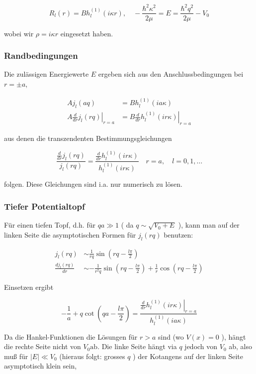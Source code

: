 \documentclass[10pt, letterpaper]{article}
\begin{document}
$$
R_{l}(r)=B h_{l}^{(1)}(i \kappa r), \quad-\frac{\hbar^{2} \kappa^{2}}{2 \mu}=E=\frac{\hbar^{2} q^{2}}{2 \mu}-V_{0}
$$

wobei wir $\rho=i \kappa r$ eingesetzt haben.

\subsubsection*{Randbedingungen}
Die zulässigen Energiewerte $E$ ergeben sich aus den Anschlussbedingungen bei $r= \pm a$,

$$
\begin{aligned}
A j_{l}(a q) & =B h_{l}^{(1)}(i a \kappa) \\
\left.A \frac{d}{d r} j_{l}(r q)\right|_{r=a} & =\left.B \frac{d}{d r} h_{l}^{(1)}(i r \kappa)\right|_{r=a}
\end{aligned}
$$

aus denen die transzendenten Bestimmungsgleichungen

$$
\frac{\frac{d}{d r} j_{l}(r q)}{j_{l}(r q)}=\frac{\frac{d}{d r} h_{l}^{(1)}(i r \kappa)}{h_{l}^{(1)}(i r \kappa)} \quad r=a, \quad l=0,1, \ldots
$$

folgen. Diese Gleichungen sind i.a. nur numerisch zu lösen.

\subsubsection*{Tiefer Potentialtopf}
Für einen tiefen Topf, d.h. für $q a \gg 1$ ( da $q \sim \sqrt{V_{0}+E}$ ), kann man auf der linken Seite die asymptotischen Formen für $j_{l}(r q)$ benutzen:

$$
\begin{aligned}
j_{l}(r q) & \sim \frac{1}{r q} \sin \left(r q-\frac{l \pi}{2}\right) \\
\frac{d j_{l}(r q)}{d r} & \sim-\frac{1}{r^{2} q} \sin \left(r q-\frac{l \pi}{2}\right)+\frac{1}{r} \cos \left(r q-\frac{l \pi}{2}\right)
\end{aligned}
$$

Einsetzen ergibt

$$
-\frac{1}{a}+q \cot \left(q a-\frac{l \pi}{2}\right)=\frac{\left.\frac{d}{d r} h_{l}^{(1)}(i r \kappa)\right|_{r=a}}{h_{l}^{(1)}(i a \kappa)}
$$

Da die Hankel-Funktionen die Lösungen für $r>a$ sind (wo $V(x)=0$ ), hängt die rechte Seite nicht von $V_{0} \mathrm{ab}$. Die linke Seite hängt via $q$ jedoch von $V_{0}$ ab, also muß für $|E| \ll V_{0}$ (hieraus folgt: grosses $q$ ) der Kotangens auf der linken Seite asymptotisch klein sein,
\end{document}
